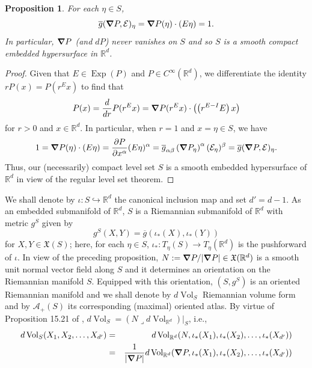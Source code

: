 \documentclass[11pt]{article}
\newtheorem{proposition}[theorem]{Proposition}
\theoremstyle{remark}
\newcommand\Exp{\operatorname{Exp}}
\newcommand{\Vol}{\operatorname{Vol}}
\newcommand{\iprod}{\mathbin{\lrcorner}}
\begin{document}
\begin{proposition}\label{prop:InnerProdIsOne}
For each $\eta\in S$, 
\begin{equation*}
    \overline{g}(\grad P,\mathcal{E})_{\eta}=\grad P(\eta)\cdot (E\eta)=1.
\end{equation*}
In particular, $\grad P$ (and $dP$) never vanishes on $S$ and so $S$ is a smooth compact embedded hypersurface in $\mathbb{R}^d$.
\end{proposition}
\begin{proof}
Given that $E\in\Exp(P)$ and $P\in C^\infty(\mathbb{R}^d)$, we differentiate the identity $rP(x)=P(r^Ex)$ to find that
\begin{equation*}
    P(x)=\frac{d}{dr}P(r^Ex)=\grad P(r^Ex)\cdot\left(\left(r^{E-I}E\right)x\right)
\end{equation*}
for $r>0$ and $x\in\mathbb{R}^d$. In particular, when $r=1$ and $x=\eta\in S$, we have
\begin{equation*}
    1=\grad P(\eta)\cdot \left(E\eta\right)=\frac{\partial P}{\partial x^\alpha}(E\eta)^\alpha=\overline{g}_{\alpha \beta}\left(\grad P_\eta\right)^{\alpha}(\mathcal{E}_\eta)^\beta=\overline{g}(\grad P,\mathcal{E})_\eta.
\end{equation*}
Thus, our (necessarily) compact level set $S$ is a smooth embedded hypersurface of $\mathbb{R}^d$ in view of the regular level set theorem.
\end{proof}
\noindent We shall denote by $\iota:  S \hookrightarrow \mathbb{R}^d$ the canonical inclusion map and set $d'=d-1$. As an embedded submanifold of $\mathbb{R}^d$, $S$ is a Riemannian submanifold of $\mathbb{R}^d$ with metric $g^S$ given by
\begin{equation*}
    g^S(X,Y)=\overline{g}(\iota_*(X),\iota_*(Y))
\end{equation*}
for $X,Y\in\mathfrak{X}(S)$; here, for each $\eta\in S$,  $\iota_*:T_\eta(S)\to T_\eta(\mathbb{R}^d)$ is the pushforward of $\iota$.  In view of the preceding proposition, $N:=\grad P/|\grad P|\in \mathfrak{X}(\mathbb{R}^d)$ is a smooth unit normal vector field along $S$ and it determines an orientation on the Riemannian manifold $S$. Equipped with this orientation, $(S,g^S)$ is an oriented Riemannian manifold and we shall denote by $d\Vol_S$ Riemannian volume form and by $\mathcal{A}_+(S)$ its corresponding (maximal) oriented atlas. By virtue of Proposition 15.21 of \cite{lee_introduction_2003}, $d\Vol_S=(N\iprod d\Vol_{\mathbb{R}^d})\vert_S$, i.e.,
\begin{eqnarray*}
    d\Vol_S(X_1,X_2,\dots,X_{d'})&=&d\Vol_{\mathbb{R}^d}(N,\iota_*(X_1),\iota_*(X_2),\dots,\iota_*(X_{d'}))\\
    &=&\frac{1}{|\grad P|}d\Vol_{\mathbb{R}^d}(\grad P,\iota_*(X_1),\iota_*(X_2),\dots,\iota_*(X_{d'}))
\end{eqnarray*}
\end{document}

